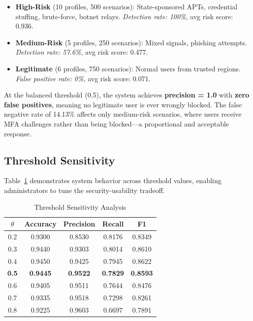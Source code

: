 \documentclass[conference]{IEEEtran}
\begin{document}
\begin{itemize}
\item \textbf{High-Risk} (10 profiles, 500 scenarios): State-sponsored APTs, credential stuffing, brute-force, botnet relays. \textit{Detection rate: 100\%}, avg risk score: 0.936.
\item \textbf{Medium-Risk} (5 profiles, 250 scenarios): Mixed signals, phishing attempts. \textit{Detection rate: 57.6\%}, avg risk score: 0.477.
\item \textbf{Legitimate} (6 profiles, 750 scenarios): Normal users from trusted regions. \textit{False positive rate: 0\%}, avg risk score: 0.071.
\end{itemize}

At the balanced threshold (0.5), the system achieves \textbf{precision = 1.0} with \textbf{zero false positives}, meaning no legitimate user is ever wrongly blocked. The false negative rate of 14.13\% affects only medium-risk scenarios, where users receive MFA challenges rather than being blocked---a proportional and acceptable response.

\subsection{Threshold Sensitivity}

Table~\ref{tab:threshold} demonstrates system behavior across threshold values, enabling administrators to tune the security-usability tradeoff.

\begin{table}[h]
\centering
\caption{Threshold Sensitivity Analysis}
\label{tab:threshold}
\begin{tabular}{@{}ccccc@{}}
\toprule
$\theta$ & Accuracy & Precision & Recall & F1 \\
\midrule
0.2 & 0.9300 & 0.8530 & 0.8176 & 0.8349 \\
0.3 & 0.9440 & 0.9303 & 0.8014 & 0.8610 \\
0.4 & 0.9450 & 0.9425 & 0.7945 & 0.8622 \\
\textbf{0.5} & \textbf{0.9445} & \textbf{0.9522} & \textbf{0.7829} & \textbf{0.8593} \\
0.6 & 0.9405 & 0.9511 & 0.7644 & 0.8476 \\
0.7 & 0.9335 & 0.9518 & 0.7298 & 0.8261 \\
0.8 & 0.9225 & 0.9603 & 0.6697 & 0.7891 \\
\bottomrule
\end{tabular}
\end{table}
\end{document}

